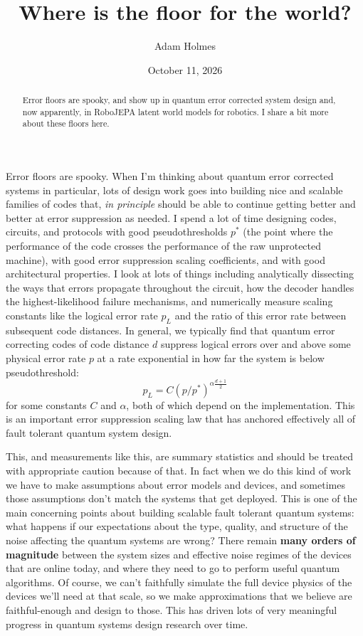 \documentclass[11pt]{article}
\title{Where is the floor for the world?}
\author{Adam Holmes}
\date{October 11, 2026}
\begin{document}
\maketitle

\begin{abstract}
Error floors are spooky, and show up in quantum error corrected system design and, now apparently, in RoboJEPA latent world models for robotics. I share a bit more about these floors here.
\end{abstract}




\section{}
Error floors are spooky. When I'm thinking about quantum error corrected systems in particular, lots of design work goes into building nice and scalable families of codes that, \emph{in principle} should be able to continue getting better and better at error suppression as needed. I spend a lot of time designing codes, circuits, and protocols with good pseudothresholds $p^*$ (the point where the performance of the code crosses the performance of the raw unprotected machine), with good error suppression scaling coefficients, and with good architectural properties. I look at lots of things including analytically dissecting the ways that errors propagate throughout the circuit, how the decoder handles the highest-likelihood failure mechanisms, and numerically measure scaling constants like the logical error rate $p_L$ and the ratio of this error rate between subsequent code distances. In general, we typically find that quantum error correcting codes of code distance $d$ suppress logical errors over and above some physical error rate $p$ at a rate exponential in how far the system is below pseudothreshold: $$ p_L = C (p/p^*)^{\alpha \frac{d+1}{2}} $$for some constants $C$ and $\alpha$, both of which depend on the implementation. This is an important error suppression scaling law that has anchored effectively all of fault tolerant quantum system design.



This, and measurements like this, are summary statistics and should be treated with appropriate caution because of that. In fact when we do this kind of work we have to make assumptions about error models and devices, and sometimes those assumptions don't match the systems that get deployed. This is one of the main concerning points about building scalable fault tolerant quantum systems: what happens if our expectations about the type, quality, and structure of the noise affecting the quantum systems are wrong? There remain \textbf{many orders of magnitude} between the system sizes and effective noise regimes of the devices that are online today, and where they need to go to perform useful quantum algorithms. Of course, we can't faithfully simulate the full device physics of the devices we'll need at that scale, so we make approximations that we believe are faithful-enough and design to those. This has driven lots of very meaningful progress in quantum systems design research over time. 
\end{document}
